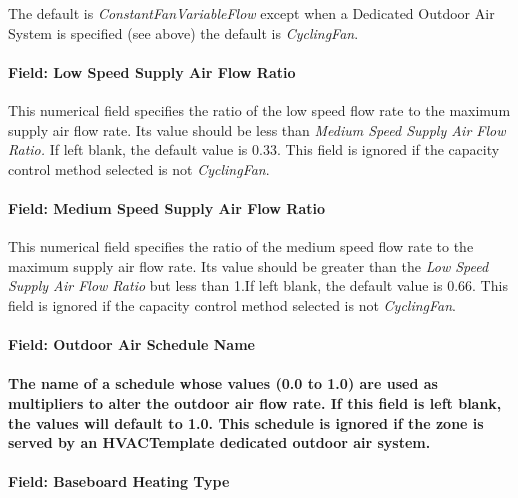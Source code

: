 The default is \emph{ConstantFanVariableFlow} except when a Dedicated Outdoor Air System is specified (see above) the default is  \emph{CyclingFan}.

\paragraph{Field: Low Speed Supply Air Flow Ratio}\label{field-low-speed-supply-air-flow-ratio}

This numerical field specifies the ratio of the low speed flow rate to the maximum supply air flow rate. Its value should be less than \emph{Medium Speed Supply Air Flow Ratio.} If left blank, the default value is 0.33. This field is ignored if the capacity control method selected is not \emph{CyclingFan}.

\paragraph{Field: Medium Speed Supply Air Flow Ratio}\label{field-medium-speed-supply-air-flow-ratio}

This numerical field specifies the ratio of the medium speed flow rate to the maximum supply air flow rate. Its value should be greater than the \emph{Low Speed Supply Air Flow Ratio} but less than 1.If left blank, the default value is 0.66. This field is ignored if the capacity control method selected is not \emph{CyclingFan}.

\paragraph{Field: Outdoor Air Schedule Name}\label{field-outdoor-air-schedule-name}

\paragraph{The name of a schedule whose values (0.0 to 1.0) are used as multipliers to alter the outdoor air flow rate. If this field is left blank, the values will default to 1.0. This schedule is ignored if the zone is served by an HVACTemplate dedicated outdoor air system.}\label{the-name-of-a-schedule-whose-values-0.0-to-1.0-are-used-as-multipliers-to-alter-the-outdoor-air-flow-rate.-if-this-field-is-left-blank-the-values-will-default-to-1.0.-this-schedule-is-ignored-if-the-zone-is-served-by-an-hvactemplate-dedicated-outdoor-air-system.}

\paragraph{Field: Baseboard Heating Type}\label{field-baseboard-heating-type-1}

